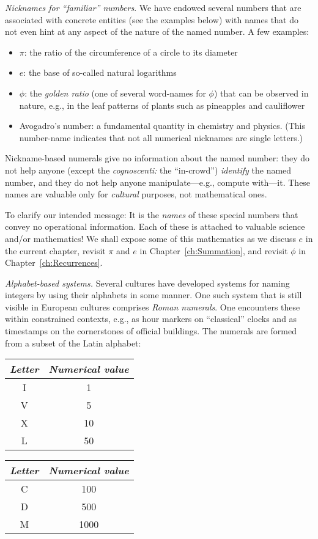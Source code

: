 \noindent
{\it Nicknames for ``familiar'' numbers}.
%
We have endowed several numbers that are associated with concrete
entities (see the examples below) with names that do not even hint at
any aspect of the nature of the named number.  A few examples:
\begin{itemize}
\item
$\pi$: the ratio of the circumference of a circle to its diameter
\item
$e$: the base of so-called natural logarithms
\item
$\phi$: the {\it golden ratio} (one of several word-names for $\phi$)
  that can be observed in nature, e.g., in the leaf patterns of plants
  such as pineapples and cauliflower
\item
Avogadro's number: a fundamental quantity in chemistry and physics.
(This number-name indicates that not all numerical nicknames are
single letters.)
\end{itemize}
Nickname-based numerals give no information about the named number:
they do not help anyone (except the {\it cognoscenti:} the
``in-crowd'') {\em identify} the named number, and they do not help
anyone manipulate---e.g., compute with---it.  These names are valuable
only for {\em cultural} purposes, not mathematical ones.

To clarify our intended message: It is the {\em names} of these
special numbers that convey no operational information.  Each of these
is attached to valuable science and/or mathematics!  We shall expose
some of this mathematics as we discuss $e$ in the current chapter,
revisit $\pi$ and $e$ in Chapter~\ref{ch:Summation}, and revisit
$\phi$ in Chapter~\ref{ch:Recurrences}.

\medskip

\noindent
{\it Alphabet-based systems.} 
%
Several cultures have developed systems for naming integers by using
their alphabets in some manner.  One such system that is still visible
in European cultures comprises {\it Roman numerals}.
 One encounters these within constrained
contexts, e.g., as hour markers on ``classical'' clocks and as
timestamps on the cornerstones of official buildings.  The numerals
are formed from a subset of the Latin alphabet:

{\small
\begin{tabular}{c|c}
{\it Letter} & {\it Numerical value} \\
\hline
I  & 1 \\
V  & 5 \\
X  & 10 \\
L  & 50
\end{tabular}
\hspace*{.5in}
\begin{tabular}{c|c}
{\it Letter} & {\it Numerical value} \\
\hline
C  & 100 \\
D  & 500 \\
M  & 1000
\end{tabular}
}

